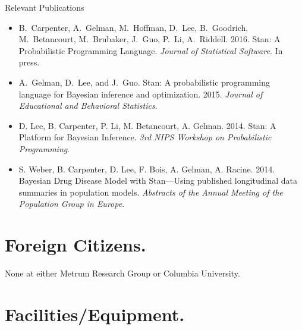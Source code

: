 \documentclass[11pt]{nih2016}
\begin{document}
\noindent
{\sc Relevant Publications}
\vspace*{-3pt}
\begin{itemize}
\item B.\ Carpenter, A.\ Gelman, M.\ Hoffman, D.\ Lee, B.\ Goodrich,
  M.\ Betancourt, M.\ Brubaker, J.\ Guo, P.\ Li, A.\ Riddell. 2016.
  Stan: A Probabilistic Programming Language. {\it Journal of
    Statistical Software}.  In press.
\item A.\ Gelman, D.\ Lee, and J.\ Guo. Stan: A probabilistic
  programming language for Bayesian inference and
  optimization. 2015. {\it Journal of Educational and Behavioral
    Statistics}.
\item D. Lee, B. Carpenter, P. Li, M. Betancourt, A. Gelman. 2014. Stan: A
  Platform for Bayesian Inference. {\it 3rd NIPS Workshop on
    Probabilistic Programming}.
\item S. Weber, B. Carpenter, D. Lee, F. Bois, A. Gelman,
  A. Racine. 2014. Bayesian Drug Disease Model with Stan---Using published
  longitudinal data summaries in population models. {\it
    Abstracts of the Annual Meeting of the Population Group in
    Europe}.
\end{itemize}



\section{Foreign Citizens.}


None at either Metrum Research Group or Columbia University.

\section{Facilities/Equipment.}
\end{document}
